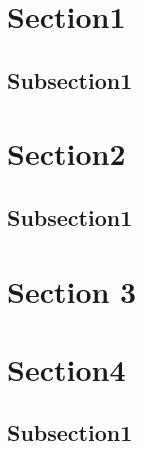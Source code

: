 \documentclass{beamer}
\begin{document}
\section{Section1}

\subsection{Subsection1}

\section{Section2}

\subsection{Subsection1}

\section{Section 3}

\section{Section4}

\subsection{Subsection1}
\end{document}
